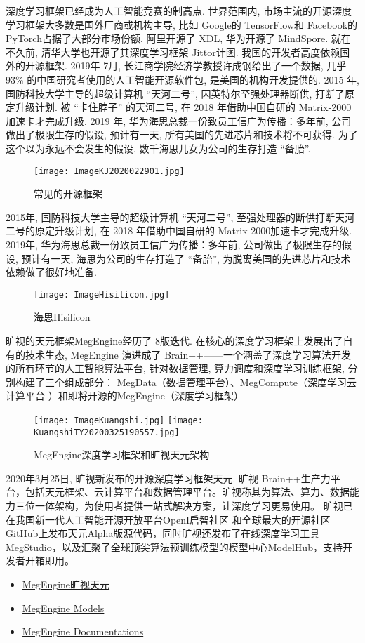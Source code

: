 深度学习框架已经成为人工智能竞赛的制高点. 世界范围内, 市场主流的开源深度学习框架大多数是国外厂商或机构主导, 比如 Google的 TensorFlow和 Facebook的 PyTorch占据了大部分市场份额.
阿里开源了 XDL, 华为开源了 MindSpore. 就在不久前, 清华大学也开源了其深度学习框架 Jittor计图.
我国的开发者高度依赖国外的开源框架. 2019年 7月, 长江商学院经济学教授许成钢给出了一个数据, 几乎 93\% 的中国研究者使用的人工智能开源软件包, 是美国的机构开发提供的.
2015 年, 国防科技大学主导的超级计算机 “天河二号”, 因英特尔至强处理器断供, 打断了原定升级计划. 被 “卡住脖子” 的天河二号, 在 2018 年借助中国自研的 Matrix-2000 加速卡才完成升级.
2019 年, 华为海思总裁一份致员工信广为传播：多年前, 公司做出了极限生存的假设, 预计有一天, 所有美国的先进芯片和技术将不可获得. 为了这个以为永远不会发生的假设, 数千海思儿女为公司的生存打造 “备胎”.
\begin{figure}[H]
\centering
\texttt{[image: ImageKJ2020022901.jpg]}
\caption{常见的开源框架}
\label{VSstudio2019CNTK013001}
\end{figure}
2015年, 国防科技大学主导的超级计算机 “天河二号”, 至强处理器的断供打断天河二号的原定升级计划, 在 2018 年借助中国自研的 Matrix-2000加速卡才完成升级.
2019年, 华为海思总裁一份致员工信广为传播：多年前, 公司做出了极限生存的假设, 预计有一天, 海思为公司的生存打造了 “备胎”, 为脱离美国的先进芯片和技术依赖做了很好地准备.
\begin{figure}[H]
\centering
\texttt{[image: ImageHisilicon.jpg]}
\caption{海思Hisilicon}
\label{ImageHisilicon2020001}
\end{figure}
旷视的天元框架MegEngine经历了 8版迭代. 在核心的深度学习框架上发展出了自有的技术生态, MegEngine 演进成了 Brain++——一个涵盖了深度学习算法开发的所有环节的人工智能算法平台, 针对数据管理, 算力调度和深度学习训练框架, 分别构建了三个组成部分： MegData（数据管理平台）、MegCompute（深度学习云计算平台 ）和即将开源的MegEngine（深度学习框架）
\begin{figure}[H]
\centering
\texttt{[image: ImageKuangshi.jpg]}
\texttt{[image: KuangshiTY20200325190557.jpg]}
\caption{MegEngine深度学习框架和旷视天元架构}
\label{ImageKuangshi2020001}
\end{figure}
2020年3月25日, 旷视新发布的开源深度学习框架天元. 旷视 Brain++生产力平台，包括天元框架、云计算平台和数据管理平台。旷视称其为算法、算力、数据能力三位一体架构，为使用者提供一站式解决方案，让深度学习更易使用。 
旷视已在我国新一代人工智能开源开放平台OpenI启智社区 和全球最大的开源社区 GitHub上发布天元Alpha版源代码，同时旷视还发布了在线深度学习工具MegStudio，以及汇聚了全球顶尖算法预训练模型的模型中心ModelHub，支持开发者开箱即用。
\begin{itemize}
\item \href{https://github.com/MegEngine/Models}{MegEngine旷视天元}
\item \href{https://github.com/MegEngine/Models}{MegEngine Models}
\item \href{https://github.com/zggl/Docs}{MegEngine Documentations}
\end{itemize}
